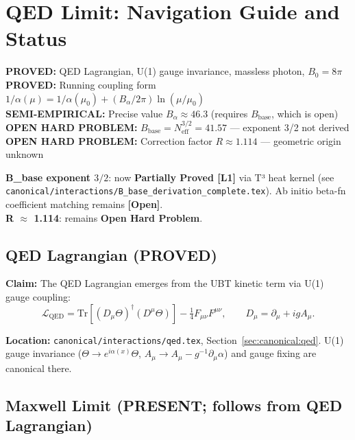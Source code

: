 \documentclass[11pt,a4paper]{article}
\begin{document}
\section{QED Limit: Navigation Guide and Status}
\label{sec:bridges:qed_limit}

\begin{tcolorbox}[colback=green!5!white,colframe=green!50!black,title=QED Limit Status Summary]
\textbf{PROVED:} QED Lagrangian, U(1) gauge invariance, massless photon, $B_0 = 8\pi$ \\
\textbf{PROVED:} Running coupling form $1/\alpha(\mu) = 1/\alpha(\mu_0) + (B_\alpha/2\pi)\ln(\mu/\mu_0)$ \\
\textbf{SEMI-EMPIRICAL:} Precise value $B_\alpha \approx 46.3$ (requires $B_\text{base}$, which is open) \\
\textbf{OPEN HARD PROBLEM:} $B_\text{base} = N_\text{eff}^{3/2} = 41.57$ — exponent 3/2 not derived \\
\textbf{OPEN HARD PROBLEM:} Correction factor $R \approx 1.114$ — geometric origin unknown
\end{tcolorbox}

\begin{tcolorbox}[colback=blue!5!white,colframe=blue!40!black,
  title=Status Update (v44)]
\textbf{B\_base exponent $3/2$}: now \textbf{Partially Proved [L1]} via
T³ heat kernel (see \texttt{canonical/interactions/B\_base\_derivation\_complete.tex}).
Ab initio beta-fn coefficient matching remains \textbf{[Open]}.\\[4pt]
\textbf{R $\approx$ 1.114}: remains \textbf{Open Hard Problem}.
\end{tcolorbox}

\subsection{QED Lagrangian (PROVED)}

\textbf{Claim:} The QED Lagrangian emerges from the UBT kinetic term via U(1) gauge coupling:
\[
\mathcal{L}_\text{QED} = \mathrm{Tr}[(D_\mu\Theta)^\dagger(D^\mu\Theta)] - \tfrac{1}{4}F_{\mu\nu}F^{\mu\nu},
\qquad D_\mu = \partial_\mu + igA_\mu.
\]

\textbf{Location:} \texttt{canonical/interactions/qed.tex},
Section~\ref{sec:canonical:qed}. U(1) gauge invariance
($\Theta \to e^{i\alpha(x)}\Theta$, $A_\mu \to A_\mu - g^{-1}\partial_\mu\alpha$)
and gauge fixing are canonical there.

\subsection{Maxwell Limit (PRESENT; follows from QED Lagrangian)}
\end{document}
